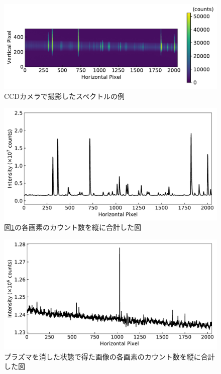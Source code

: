 \begin{figure}
    \centering
    \includegraphics[width=15cm]{pictures/picture-example.pdf}
    \caption{CCDカメラで撮影したスペクトルの例}
    \label{fig:picture-example}
\end{figure}

\begin{figure}
    \centering
    \includegraphics[width=15cm]{pictures/spectrum-example.pdf}
    \caption{図\ref{fig:picture-example}の各画素のカウント数を縦に合計した図}
    \label{fig:spectrum-example}
\end{figure}

\begin{figure}
    \centering
    \includegraphics[width=15cm]{pictures/back-spectrum-example.pdf}
    \caption{プラズマを消した状態で得た画像の各画素のカウント数を縦に合計した図}
    \label{fig:back-spectrum-example}
\end{figure}

